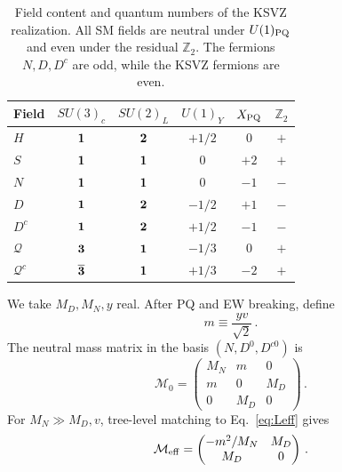 \documentclass[aps,prd,reprint,preprintnumbers,superscriptaddress,nofootinbib,floatfix]{revtex4-2}
\begin{document}
\begin{table}[t]
    \centering
    \renewcommand{\arraystretch}{1.15}
    \begin{tabular}{lccccc}
    \toprule
    Field & $SU(3)_c$ & $SU(2)_L$ & $U(1)_Y$ & $X_{\rm PQ}$ & $\mathbb Z_2$ \\
    \midrule
    $H$              & ${\bf1}$           & ${\bf2}$ & $+1/2$ & $0$  & $+$ \\
    $S$              & ${\bf1}$           & ${\bf1}$ & $0$    & $+2$ & $+$ \\
    $N$              & ${\bf1}$           & ${\bf1}$ & $0$    & $-1$ & $-$ \\
    $D$              & ${\bf1}$           & ${\bf2}$ & $-1/2$ & $+1$ & $-$ \\
    $D^c$            & ${\bf1}$           & ${\bf2}$ & $+1/2$ & $-1$ & $-$ \\
    $\mathcal Q$     & ${\bf3}$           & ${\bf1}$ & $-1/3$ & $0$  & $+$ \\
    $\mathcal Q^c$   & $\overline{\bf3}$  & ${\bf1}$ & $+1/3$ & $-2$ & $+$ \\
    \bottomrule
    \end{tabular}
    \caption{Field content and quantum numbers of the KSVZ realization. All SM fields are neutral under $U(1)_{\rm PQ}$ and even under the residual $\mathbb Z_2$. The fermions $N,D,D^c$ are odd, while the KSVZ fermions are even.}
    \label{tab:charges}
\end{table}
We take $M_D,M_N,y$ real. After PQ and EW breaking, define
\begin{equation}
    m \equiv \frac{yv}{\sqrt{2}}\,.
\end{equation}
The neutral mass matrix in the basis $(N,D^0,D^{c0})$ is
\begin{equation}
    \mathcal M_0=
    \begin{pmatrix}
    M_N&m&0\\
    m&0&M_D\\
    0&M_D&0
    \end{pmatrix}\,.
    \label{eq:M0}
\end{equation}
For $M_N\gg M_D,v$, tree-level matching to Eq.~\eqref{eq:Leff} gives
\begin{equation}
    \mathcal M_{\rm eff} =
    \begin{pmatrix}
    -m^2/M_N&M_D\\
    M_D&0
    \end{pmatrix}\,.
    \label{eq:Meff}
\end{equation}
\end{document}
